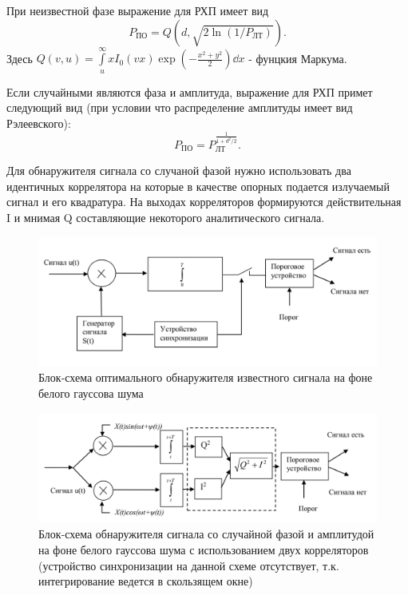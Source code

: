 При неизвестной фазе выражение для РХП имеет вид
\begin{equation}
    P_\text{ПО} = Q(d, \sqrt{2 \ln(1/P_\text{ЛТ})}).
\end{equation}
Здесь  $Q(v,u) = \int \limits_{u}^{\infty} x I_0 (v x) \exp \left(-\frac{x^2 + y^2}{2}\right) \dd x$ - 
фунцкия Маркума.

Если случайными являются фаза и амплитуда, выражение для РХП примет следующий вид (при условии что
распределение амплитуды имеет вид Рэлеевского):
\begin{equation}
    P_\text{ПО} = P_\text{ЛТ}^{\frac{1}{1+d^2/2}}.
\end{equation}


Для обнаружителя сигнала со случаной фазой нужно использовать два идентичных коррелятора
на которые в качестве опорных подается излучаемый сигнал и его квадратура. На выходах
корреляторов формируются действительная I и мнимая Q составляющие некоторого
аналитического сигнала.


\begin{figure}[h!]
	\centering
	\includegraphics[width =0.8\linewidth]{imgs/scheme1.png}
	\caption{Блок-схема оптимального обнаружителя известного сигнала на фоне белого гауссова
    шума}
	\label{fig:scheme1}
\end{figure}

\begin{figure}[h!]
	\centering
	\includegraphics[width =0.8\linewidth]{imgs/scheme2.png}
	\caption{Блок-схема обнаружителя сигнала со случайной фазой и амплитудой на фоне белого
    гауссова шума с использованием двух корреляторов (устройство синхронизации на данной
    схеме отсутствует, т.к. интегрирование ведется в скользящем окне)
    }
	\label{fig:scheme2}
\end{figure}

